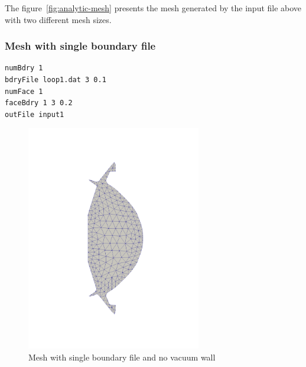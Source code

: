 The figure~\ref{fig:analytic-mesh} presents the mesh generated by the input file above with two different mesh sizes.


%

\subsubsection{Mesh with single boundary file}

\begin{verbatim}
numBdry 1
bdryFile loop1.dat 3 0.1
numFace 1
faceBdry 1 3 0.2
outFile input1
\end{verbatim}

\begin{figure}
\centering
\includegraphics[width=3in]{./figures/meshgen-input1-novacuum.pdf}
\caption{Mesh with single boundary file and no vacuum wall}
\label{fig:input1}
\end{figure}

